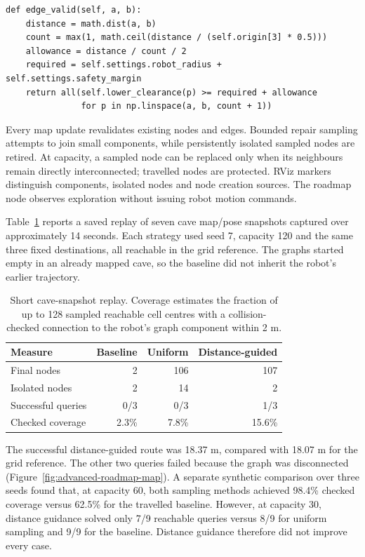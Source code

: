 \documentclass[a4paper,11pt]{article}
\begin{document}
\begin{lstlisting}[caption={Collision checking along a proposed roadmap edge}, label={lst:advanced-roadmap-edge}]
def edge_valid(self, a, b):
    distance = math.dist(a, b)
    count = max(1, math.ceil(distance / (self.origin[3] * 0.5)))
    allowance = distance / count / 2
    required = self.settings.robot_radius + self.settings.safety_margin
    return all(self.lower_clearance(p) >= required + allowance
               for p in np.linspace(a, b, count + 1))
\end{lstlisting}

Every map update revalidates existing nodes and edges. Bounded repair sampling
attempts to join small components, while persistently isolated sampled nodes
are retired. At capacity, a sampled node can be replaced only when its neighbours
remain directly interconnected; travelled nodes are protected. RViz markers
distinguish components, isolated nodes and node creation sources. The roadmap
node observes exploration without issuing robot motion commands.

Table~\ref{tab:advanced-roadmap-results} reports a saved replay of seven cave
map/pose snapshots captured over approximately 14 seconds. Each strategy used
seed 7, capacity 120 and the same three fixed destinations, all reachable in the
grid reference. The graphs started empty in an already mapped cave, so the
baseline did not inherit the robot's earlier trajectory.

\begin{table}[H]
    \centering
    \small
    \begin{tabular}{lrrr}
        \hline
        Measure & Baseline & Uniform & Distance-guided \\
        \hline
        Final nodes & 2 & 106 & 107 \\
        Isolated nodes & 2 & 14 & 2 \\
        Successful queries & 0/3 & 0/3 & 1/3 \\
        Checked coverage & 2.3\% & 7.8\% & 15.6\% \\
        \hline
    \end{tabular}
    \caption{Short cave-snapshot replay. Coverage estimates the fraction of up
    to 128 sampled reachable cell centres with a collision-checked connection
    to the robot's graph component within 2 m.}
    \label{tab:advanced-roadmap-results}
\end{table}

The successful distance-guided route was 18.37 m, compared with 18.07 m for the
grid reference. The other two queries failed because the graph was disconnected
(Figure~\ref{fig:advanced-roadmap-map}). A separate synthetic comparison over
three seeds found that, at capacity 60, both sampling methods achieved 98.4\%
checked coverage versus 62.5\% for the travelled baseline. However, at capacity
30, distance guidance solved only 7/9 reachable queries versus 8/9 for uniform
sampling and 9/9 for the baseline. Distance guidance therefore did not improve
every case.
\end{document}
